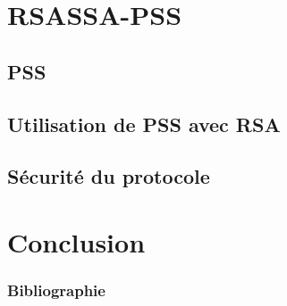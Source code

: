 \documentclass[12pt]{beamer}
\begin{document}
\section{RSASSA-PSS}
\subsection{PSS}
\begin{frame}
\transwipe

\end{frame}
\subsection{Utilisation de PSS avec RSA}
\begin{frame}
\transwipe

\end{frame}
\subsection{Sécurité du protocole}
\begin{frame}
\transwipe

\end{frame}
\section{Conclusion}
\begin{frame}
\transwipe

\end{frame}
\begin{frame}[shrink]
\frametitle{Bibliographie}
\nocite{*}


\end{frame}
\end{document}
